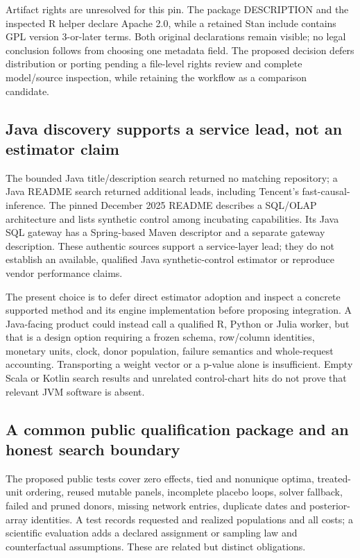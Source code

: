 Artifact rights are unresolved for this pin. The package DESCRIPTION and
the inspected R helper declare Apache 2.0, while a retained Stan include
contains GPL version 3-or-later terms. Both original declarations remain
visible; no legal conclusion follows from choosing one metadata field.
The proposed decision defers distribution or porting pending a file-level
rights review and complete model/source inspection, while retaining the
workflow as a comparison candidate.~\citep{exec25_synthcross_bsynth}

\subsection{Java discovery supports a service lead, not an estimator claim}
The bounded Java title/description search returned no matching repository;
a Java README search returned additional leads, including Tencent's
fast-causal-inference. The pinned December 2025 README describes a SQL/OLAP
architecture and lists synthetic control among incubating capabilities.
Its Java SQL gateway has a Spring-based Maven descriptor and a separate
gateway description. These authentic sources support a service-layer lead;
they do not establish an available, qualified Java synthetic-control
estimator or reproduce vendor performance claims.~\citep{exec25_synthcross_tencent}

The present choice is to defer direct estimator adoption and inspect a
concrete supported method and its engine implementation before proposing
integration. A Java-facing product could instead call a qualified R,
Python or Julia worker, but that is a design option requiring a frozen
schema, row/column identities, monetary units, clock, donor population,
failure semantics and whole-request accounting. Transporting a weight
vector or a p-value alone is insufficient. Empty Scala or Kotlin search
results and unrelated control-chart hits do not prove that relevant JVM
software is absent.~\citep{exec25_synthcross_choice}

\subsection{A common public qualification package and an honest search boundary}
The proposed public tests cover zero effects, tied and nonunique optima,
treated-unit ordering, reused mutable panels, incomplete placebo loops,
solver fallback, failed and pruned donors, missing network entries,
duplicate dates and posterior-array identities. A test records requested
and realized populations and all costs; a scientific evaluation adds a
declared assignment or sampling law and counterfactual assumptions.
These are related but distinct obligations.~\citep{exec25_synthcross_choice}

